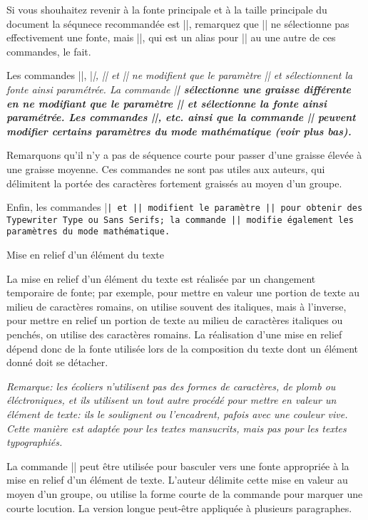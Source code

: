 Si vous shouhaitez revenir à la fonte principale et à la taille
principale du document la séqunece recommandée est
|\mainfont\mainsize|, remarquez que |\mainfont| ne sélectionne pas
effectivement une fonte, mais |\mainsize|, qui est un alias pour
|\tenpoint| au une autre de ces commandes, le fait.

Les commandes |\rm|, |\it|, |\sl| et |\sc| ne modifient que le
paramètre |\fontshape| et sélectionnent la fonte ainsi paramétrée. La
commande |\bf| sélectionne une graisse différente en ne modifiant que
le paramètre |\fontseries| et sélectionne la fonte ainsi
paramétrée. Les commandes |\rm|, etc. ainsi que la commande |\bf|
peuvent modifier certains paramètres du mode mathématique (voir plus
bas).

Remarquons qu'il n'y a pas de séquence courte pour passer d'une
graisse élevée à une graisse moyenne. Ces commandes ne sont pas utiles
aux auteurs, qui délimitent la portée des caractères fortement
graissés au moyen d'un groupe.

Enfin, les commandes |\tt| et |\sf| modifient le paramètre
|\fontfamily| pour obtenir des Typewriter Type ou Sans Serifs; la
commande |\sf| modifie également les paramètres du mode mathématique.


\formalpar Mise en relief d'un élément du texte

La mise en relief d'un élément du texte est réalisée par un changement
temporaire de fonte; par exemple, pour mettre en valeur une portion de
texte au milieu de caractères romains, on utilise souvent des
italiques, mais à l'inverse, pour mettre en relief un portion de texte
au milieu de caractères italiques ou penchés, on utilise des
caractères romains. La réalisation d'une mise en relief dépend donc de
la fonte utilisée lors de la composition du texte dont un élément
donné doit se détacher.

\em{Remarque: les écoliers n'utilisent pas des formes de caractères,
de plomb ou éléctroniques, et ils utilisent un tout autre procédé pour
mettre en valeur un élément de texte: ils le soulignent ou
l'encadrent, pafois avec une couleur vive. Cette manière est adaptée
pour les textes mansucrits, mais pas pour les textes typographiés.}

La commande |\emphasis| peut être utilisée pour basculer vers une
fonte appropriée à la mise en relief d'un élément de texte. L'auteur
délimite cette mise en valeur au moyen d'un groupe, ou utilise la
forme courte de la commande
\begincode
\def\em#1{{\emphasis #1}}
\endcode
pour marquer une courte locution. La version longue peut-être
appliquée à plusieurs paragraphes.

